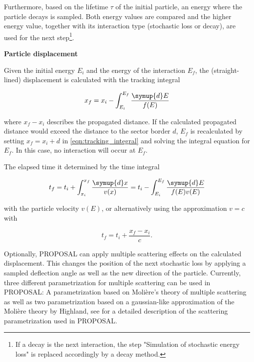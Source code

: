Furthermore, based on the lifetime $\tau$ of the initial particle, an energy where the particle decays is sampled.
Both energy values are compared and the higher energy value, together with its interaction type (stochastic loss or decay), are used for the next step\footnote{If a decay is the next interaction, the step "Simulation of stochastic energy loss" is replaced accordingly by a decay method.}.

\textbf{Particle displacement}

Given the initial energy $E_i$ and the energy of the interaction $E_f$, the (straight-lined) displacement is calculated with the tracking integral

\begin{equation}
	\label{eqn:tracking_integral}
	x_f = x_i - \int_{E_i}^{E_f} \frac{\symup{d}E}{f(E)}
\end{equation}

where $x_f - x_i$ describes the propagated distance.
If the calculated propagated distance would exceed the distance to the sector border $d$, $E_f$ is recalculated by setting $x_f = x_i + d$ in \ref{eqn:tracking_integral} and solving the integral equation for $E_f$.
In this case, no interaction will occur at $E_f$.

The elapsed time it determined by the time integral 

\begin{equation}
	t_f = t_i + \int_{x_i}^{x_f} \frac{\symup{d}x}{v(x)} = t_i - \int_{E_i}^{E_f} \frac{\symup{d}E}{f(E)v(E)}
\end{equation}

with the particle velocity $v(E)$, or alternatively using the approximation $v=c$ with 

\begin{equation}
	t_f = t_i + \frac{x_f - x_i}{c}.
\end{equation}

Optionally, PROPOSAL can apply multiple scattering effects on the calculated displacement.
This changes the position of the next stochastic loss by applying a sampled deflection angle as well as the new direction of the particle.
Currently, three different parametrization for multiple scattering can be used in PROPOSAL:
A parametrization based on Molière's theory of multiple scattering as well as two parametrization based on a gaussian-like approximation of the Molière theory by Highland, see \cite{GeiselBrinck2013RevisionOT} for a detailed description of the scattering parametrization used in PROPOSAL. 

